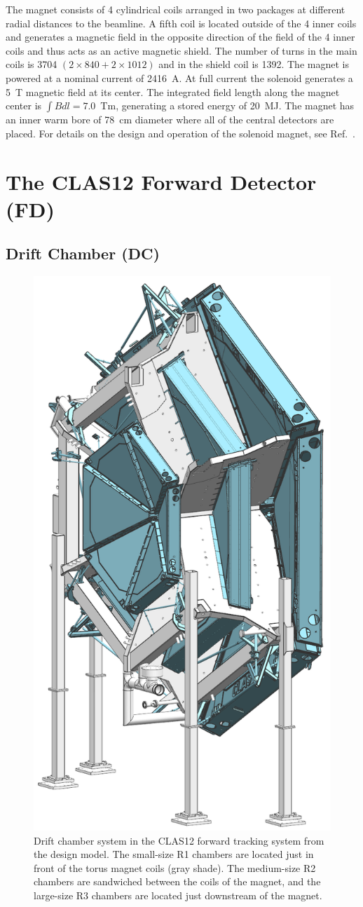 \documentclass[final,3p]{elsarticle}
\begin{document}
\begin{twocolumn}
The magnet consists of 4 cylindrical coils arranged in two packages at different radial distances to the beamline.
A fifth coil is located outside of the 4 inner coils and generates a magnetic field in the opposite direction of the
field of the 4 inner coils and thus acts as an active magnetic shield. The number of turns in the main coils is 3704
$(2 \times 840 + 2 \times 1012)$ and in the shield coil is 1392. The magnet is powered at a nominal current of
2416~A. At full current the solenoid generates a 5~T magnetic field at its center. The integrated field length along
the magnet center is $\int \!\! Bdl = 7.0$~Tm, generating a stored energy of 20~MJ. The magnet has an inner warm
bore of 78~cm diameter where all of the central detectors are placed.  For details on the design and operation of the
solenoid magnet, see Ref.~\cite{clas12-magnets}.

\section{The CLAS12 Forward Detector (FD)}

\subsection{Drift Chamber (DC)}
\begin{figure}[ht!]
\centerline{\includegraphics[width=0.60\columnwidth]{dc-view-4.png}}
\caption{Drift chamber system in the CLAS12 forward tracking system from the design model. The small-size R1
  chambers are located just in front of the torus magnet coils (gray shade). The medium-size R2 chambers are
  sandwiched between the coils of the magnet, and the large-size R3 chambers are located just downstream of the
  magnet.}
\label{clas12-dc}
\end{figure}


\end{twocolumn}
\end{document}
